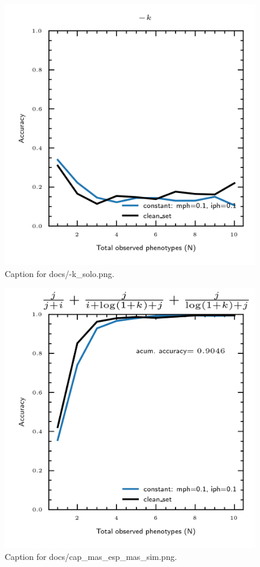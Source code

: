 \documentclass{article}
\begin{document}
\begin{figure}[h] \centering \includegraphics{docs/-k_solo.png} \caption{Caption for docs/-k_solo.png.} \end{figure}
\begin{figure}[h] \centering \includegraphics{docs/cap_mas_esp_mas_sim.png} \caption{Caption for docs/cap_mas_esp_mas_sim.png.} \end{figure}
\end{document}
